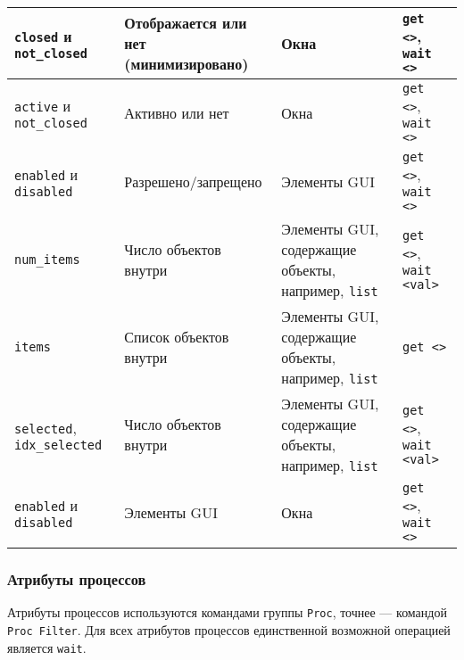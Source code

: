 \documentclass[11pt]{book} %
\begin{document}
\begin{center}
\begin{tabular}{|p{90pt}|p{120pt}|p{100pt}|p{60pt}|}
		\verb|closed| и \verb|not_closed| & Отображается или нет (минимизировано) & Окна & \verb|get <>|,  \verb|wait <>|\\ \hline
		\verb|active| и \verb|not_closed| & Активно или нет & Окна & \verb|get <>|,  \verb|wait <>| \\ \hline
		\verb|enabled| и \verb|disabled| & Разрешено/запрещено & Элементы GUI & \verb|get <>|,  \verb|wait <>|\\ \hline
		\verb|num_items| & Число объектов внутри & Элементы GUI, содержащие объекты, например, \verb|list| & \verb|get <>|,  \verb|wait <val>|\\ \hline
		\verb|items| & Список объектов внутри & Элементы GUI, содержащие объекты, например, \verb|list| & \verb|get <>|\\ \hline		
		\verb|selected|,  \verb|idx_selected|& Число объектов внутри & Элементы GUI, содержащие объекты, например, \verb|list| & \verb|get <>|,  \verb|wait <val>|\\ \hline		
		
		\verb|enabled| и \verb|disabled| & Элементы GUI & Окна & \verb|get <>|,  \verb|wait <>|\\ \hline
		
	\end{tabular}
\end{center}

\subsubsection{Атрибуты процессов}

Атрибуты процессов используются командами группы \verb|Proc|, точнее --- командой \verb|Proc Filter|. Для всех атрибутов процессов единственной возможной операцией является \verb|wait|.
\end{document}
